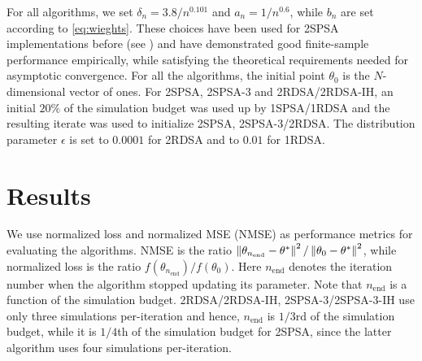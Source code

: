 For all algorithms, we set $\delta_n = 3.8/n^{0.101}$ and $a_n = 1/n^{0.6}$, while $b_n$ are set according to \eqref{eq:wieghts}. These choices have been used  for 2SPSA implementations before (see \cite{spall_adaptive}) and have demonstrated good finite-sample performance empirically, while satisfying the theoretical requirements needed for asymptotic convergence.  For all the algorithms, the initial point $\theta_0$ is the $N$-dimensional vector of ones.  For  2SPSA, 2SPSA-3 and 2RDSA/2RDSA-IH, an initial $20\%$ of the  simulation budget was used up by 1SPSA/1RDSA and the resulting iterate was used to initialize 2SPSA, 2SPSA-3/2RDSA. The distribution parameter $\epsilon$ is set to $0.0001$ for 2RDSA and to $0.01$ for 1RDSA. 

\section{Results}
We use normalized loss and normalized MSE (NMSE) as performance metrics for evaluating the algorithms. 
NMSE is the ratio $\left\| \theta_{n_\text{end}} - \theta^* \right\|^2 / \left\| \theta_0 - \theta^*\right\|^2$, while normalized loss is the ratio $f(\theta_{n_\text{end}})/f(\theta_0)$.  Here $n_\text{end}$ denotes the iteration number when the algorithm stopped updating its parameter. Note that $n_\text{end}$ is a function of the simulation budget. 2RDSA/2RDSA-IH, 2SPSA-3/2SPSA-3-IH use only three simulations per-iteration and hence, $n_\text{end}$ is $1/3$rd of the simulation budget, while it is $1/4$th of the simulation budget for 2SPSA, since the latter algorithm uses four simulations per-iteration. 

